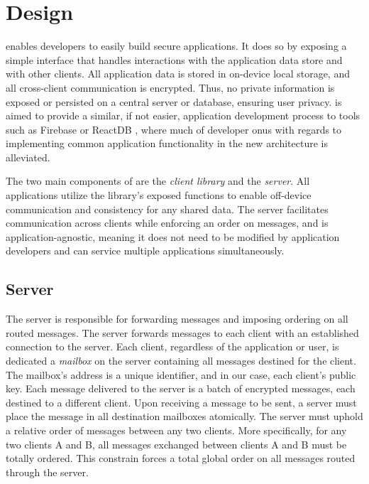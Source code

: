 \section{Design}

\name{} enables developers to easily build secure applications. It does so by exposing a simple interface that handles interactions with the application data store and with other clients. All application data is stored in on-device local storage, and all cross-client communication is encrypted. Thus, no private information is exposed or persisted on a central server or database, ensuring user privacy. \name{} is aimed to provide a similar, if not easier, application development process to tools such as Firebase  or ReactDB \tocite{}, where much of developer onus with regards to implementing common application functionality in the new architecture is alleviated.

The two main components of \name{} are the \textit{client library} and the \textit{\name{} server}. All \name{} applications utilize the library's exposed functions to enable off-device communication and consistency for any shared data. The server facilitates communication across clients while enforcing an order on messages, and is application-agnostic, meaning it does not need to be modified by application developers and can service multiple applications simultaneously. 

\subsection{Server}
The server is responsible for forwarding messages and imposing ordering on all routed messages. The server forwards messages to each client with an established connection to the server. Each client, regardless of the application or user, is dedicated a \textit{mailbox} on the server containing all messages destined for the client. The mailbox's address is a unique identifier, and in our case, each client's public key. Each message delivered to the server is a batch of encrypted messages, each destined to a different client. Upon receiving a message to be sent, a server must place the message in all destination mailboxes atomically. The server must uphold a relative order of messages between any two clients. More specifically, for any two clients A and B, all messages exchanged between clients A and B must be totally ordered. This constrain forces a total global order on all messages routed through the server. 

